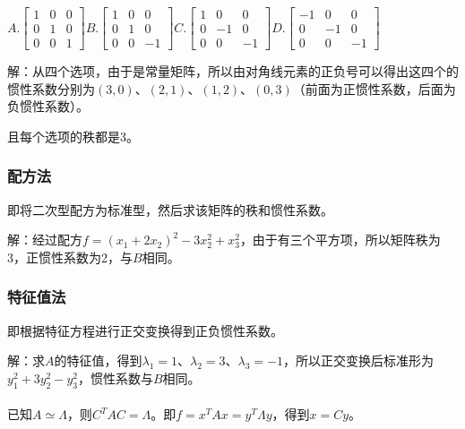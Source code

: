 $A.\left[\begin{array}{ccc}
    1 & 0 & 0 \\
    0 & 1 & 0 \\
    0 & 0 & 1
\end{array}\right]$\;$B.\left[\begin{array}{ccc}
    1 & 0 & 0 \\
    0 & 1 & 0 \\
    0 & 0 & -1
\end{array}\right]$\;$C.\left[\begin{array}{ccc}
    1 & 0 & 0 \\
    0 & -1 & 0 \\
    0 & 0 & -1
\end{array}\right]$\;$D.\left[\begin{array}{ccc}
    -1 & 0 & 0 \\
    0 & -1 & 0 \\
    0 & 0 & -1
\end{array}\right]$ \medskip

解：从四个选项，由于是常量矩阵，所以由对角线元素的正负号可以得出这四个的惯性系数分别为$(3,0)$、$(2,1)$、$(1,2)$、$(0,3)$（前面为正惯性系数，后面为负惯性系数）。

且每个选项的秩都是3。

\subsubsection{配方法}

即将二次型配方为标准型，然后求该矩阵的秩和惯性系数。

解：经过配方$f=(x_1+2x_2)^2-3x_2^2+x_3^2$，由于有三个平方项，所以矩阵秩为3，正惯性系数为2，与$B$相同。

\subsubsection{特征值法}

即根据特征方程进行正交变换得到正负惯性系数。

解：求$A$的特征值，得到$\lambda_1=1$、$\lambda_2=3$、$\lambda_3=-1$，所以正交变换后标准形为$y_1^2+3y_2^2-y_3^2$，惯性系数与$B$相同。

\paragraph{}

已知$A\simeq\Lambda$，则$C^TAC=\Lambda$。即$f=x^TAx=y^T\Lambda y$，得到$x=Cy$。

